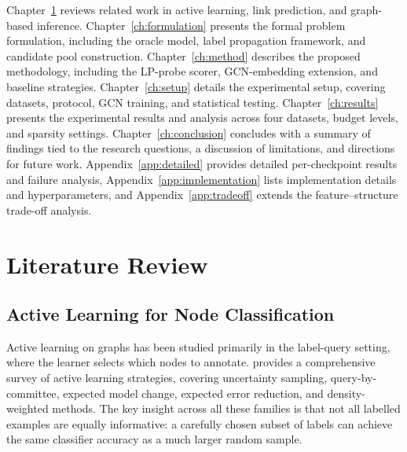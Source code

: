 \documentclass[12pt,a4paper,oneside]{report}
\begin{document}
Chapter~\ref{ch:lit} reviews related work in active learning, link prediction, and graph-based inference. Chapter~\ref{ch:formulation} presents the formal problem formulation, including the oracle model, label propagation framework, and candidate pool construction. Chapter~\ref{ch:method} describes the proposed methodology, including the LP-probe scorer, GCN-embedding extension, and baseline strategies. Chapter~\ref{ch:setup} details the experimental setup, covering datasets, protocol, GCN training, and statistical testing. Chapter~\ref{ch:results} presents the experimental results and analysis across four datasets, budget levels, and sparsity settings. Chapter~\ref{ch:conclusion} concludes with a summary of findings tied to the research questions, a discussion of limitations, and directions for future work. Appendix~\ref{app:detailed} provides detailed per-checkpoint results and failure analysis, Appendix~\ref{app:implementation} lists implementation details and hyperparameters, and Appendix~\ref{app:tradeoff} extends the feature--structure trade-off analysis.


\chapter{Literature Review}
\label{ch:lit}

\section{Active Learning for Node Classification}

Active learning on graphs has been studied primarily in the label-query setting, where the learner selects which nodes to annotate. \citet{settles} provides a comprehensive survey of active learning strategies, covering uncertainty sampling, query-by-committee, expected model change, expected error reduction, and density-weighted methods. The key insight across all these families is that not all labelled examples are equally informative: a carefully chosen subset of labels can achieve the same classifier accuracy as a much larger random sample.
\end{document}
